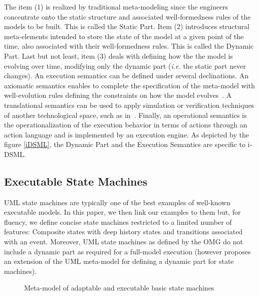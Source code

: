 \documentclass[english, 10pt]{llncs}
\begin{document}
The item (1) is realized by traditional meta-modeling since the
engineers concentrate onto the static structure and associated
well-formedness rules of the models to be built. This is called the
Static Part. Item (2) introduces structural meta-elements intended to
store the state of the model at a given point of the time, also
associated with their well-formedness rules. This is called the
Dynamic Part. Last but not least, item (3) deals with defining how the
the model is evolving over time, modifying only the dynamic part
(\textit{i.e.} the static part never changes). An execution semantics
can be defined under several declinations. An axiomatic semantics
enables to complete the specification of the meta-model with
well-evolution rules defining the constraints on how the model
evolves~\cite{cariou-ecmfa11}. A translational semantics can be used
to apply simulation or verification techniques of another
technological space, such as in~\cite{combemale-jos09}. Finally, an
operational semantics is the operationalization of the execution
behavior in terms of actions through an action language and is
implemented by an execution engine. As depicted by the figure
\ref{iDSML}, the Dynamic Part and the Execution Semantics are specific
to i-DSML.


\subsection{Executable State Machines}

UML state machines are typically one of the best examples of
well-known executable models. In this paper, we then link our examples
to them but, for fluency, we define concise state machines restricted
to a limited number of features: Composite states with deep history
states and transitions associated with an event. Moreover, UML state
machines as defined by the OMG do not include a dynamic part as
required for a full-model execution (however \cite{cariou-ecmfa11}
proposes an extension of the UML meta-model for defining a dynamic
part for state machines).

\begin{figure}[htbp]
\begin{center}
\caption{Meta-model of adaptable and executable basic state machines}
\label{mm-sm-adapt}
\end{center}
\end{figure}
\end{document}
